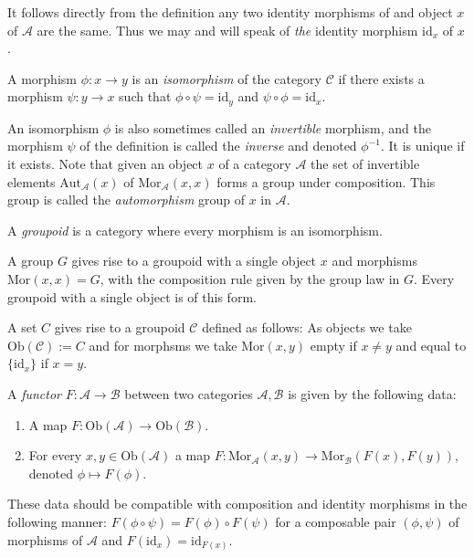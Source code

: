 \begin{remark}
\label{remark-unique-indentity}
It follows directly from the definition any two identity morphisms
of and object $x$ of $\mathcal{A}$ are the same. Thus we may and will
speak of {\it the} identity morphism $\text{id}_x$ of $x$.
\end{remark}

\begin{definition}
\label{definition-isomorphism}
A morphism $\phi : x \to y$ is an {\it isomorphism} of the category
$\mathcal{C}$ if there exists a morphism $\psi : y \to x$
such that $\phi \circ \psi = \text{id}_y$ and
$\psi \circ \phi = \text{id}_x$.
\end{definition}

\noindent
An isomorphism $\phi$ is also sometimes called an {\it invertible}
morphism, and the morphism $\psi$ of the definition is called the
{\it inverse} and denoted $\phi^{-1}$. It is unique if it exists. Note that
given an object $x$ of a category $\mathcal{A}$ the set of invertible
elements $\text{Aut}_{\mathcal{A}}(x)$
of $\text{Mor}_{\mathcal{A}}(x,x)$ forms a group under composition. 
This group is called the {\it automorphism} group of $x$ in $\mathcal{A}$.

\begin{definition} 
\label{definition-groupoid}
A {\it groupoid} is a category where every morphism is an isomorphism.
\end{definition}

\begin{example}
\label{example-group-groupoid}
A group $G$ gives rise to a groupoid with a single object $x$
and morphisms $\text{Mor}(x,x) = G$, with the composition rule
given by the group law in $G$. Every groupoid with a single
object is of this form.
\end{example}

\begin{example}
\label{example-set-groupoid}
A set $C$ gives rise to a groupoid $\mathcal{C}$ defined as follows:
As objects we take $\text{Ob}(\mathcal{C}) := C$ and for morphsms
we take $\text{Mor}(x,y)$ empty if $x\neq y$ and equal to
$\{\text{id}_x\}$ if $x=y$.
\end{example}

\begin{definition}
\label{definition-functor}
A {\it functor} $F : \mathcal{A} \to \mathcal{B}$
between two categories $\mathcal{A}, \mathcal{B}$ is given by the
following data:
\begin{enumerate}
\item A map $F : \text{Ob}(\mathcal{A}) \to \text{Ob}(\mathcal{B})$.
\item For every $x,y \in \text{Ob}(\mathcal{A})$ a map
$F : \text{Mor}_\mathcal{A}(x,y) \to \text{Mor}_\mathcal{B}(F(x), F(y))$,
denoted $\phi \mapsto F(\phi)$.
\end{enumerate}
These data should be compatible with composition and identity morphisms
in the following manner: $F(\phi \circ \psi) =
F(\phi) \circ F(\psi)$ for a composable pair $(\phi, \psi)$ of
morphisms of $\mathcal{A}$ and $F(\text{id}_x) = \text{id}_{F(x)}$.
\end{definition}

